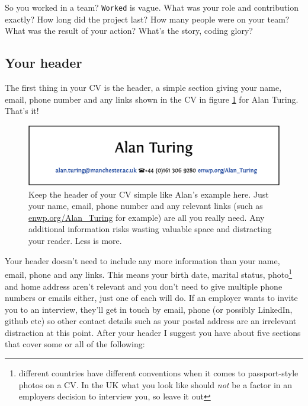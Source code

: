 \documentclass[
]{book}
\begin{document}
So you worked in a team? \texttt{Worked} is vague. What was your role and contribution exactly? How long did the project last? How many people were on your team? What was the result of your action? What's the story, coding glory? \citep{whatsthestory}

\hypertarget{mycvpd}{%
\subsection{Your header}\label{mycvpd}}

The first thing in your CV is the header, a simple section giving your name, email, phone number and any links shown in the CV in figure \ref{fig:turinghead-fig} for Alan Turing. That's it!

\begin{figure}

{\centering \includegraphics[width=0.98\linewidth]{images/alan-turing-header} 

}

\caption{Keep the header of your CV simple like Alan's example here. Just your name, email, phone number and any relevant links (such as \href{https://enwp.org/Alan_Turing}{enwp.org/Alan\_Turing} for example) are all you really need. Any additional information risks wasting valuable space and distracting your reader. Less is more.}\label{fig:turinghead-fig}
\end{figure}



Your header doesn't need to include any more information than your name, email, phone and any links. This means your birth date, marital status, photo\footnote{different countries have different conventions when it comes to passport-style photos on a CV. In the UK what you look like should \emph{not} be a factor in an employers decision to interview you, so leave it out} and home address aren't relevant and you don't need to give multiple phone numbers or emails either, just one of each will do. If an employer wants to invite you to an interview, they'll get in touch by email, phone (or possibly LinkedIn, github etc) so other contact details such as your postal address are an irrelevant distraction at this point. After your header I suggest you have about five sections that cover some or all of the following:
\end{document}
